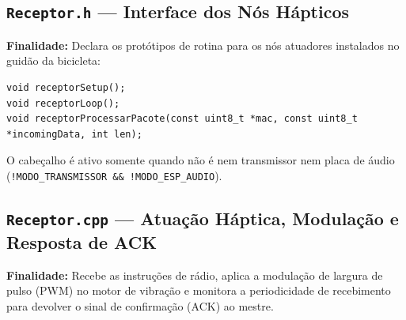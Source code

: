 \documentclass[12pt,a4paper]{article}
\begin{document}
\subsection{\texttt{Receptor.h} --- Interface dos Nós Hápticos}
\textbf{Finalidade:} Declara os protótipos de rotina para os nós atuadores instalados no guidão da bicicleta:
\begin{lstlisting}
void receptorSetup();
void receptorLoop();
void receptorProcessarPacote(const uint8_t *mac, const uint8_t *incomingData, int len);
\end{lstlisting}
O cabeçalho é ativo somente quando não é nem transmissor nem placa de áudio (\texttt{!MODO\_TRANSMISSOR \&\& !MODO\_ESP\_AUDIO}).

\subsection{\texttt{Receptor.cpp} --- Atuação Háptica, Modulação e Resposta de ACK}
\textbf{Finalidade:} Recebe as instruções de rádio, aplica a modulação de largura de pulso (PWM) no motor de vibração e monitora a periodicidade de recebimento para devolver o sinal de confirmação (ACK) ao mestre.
\end{document}
